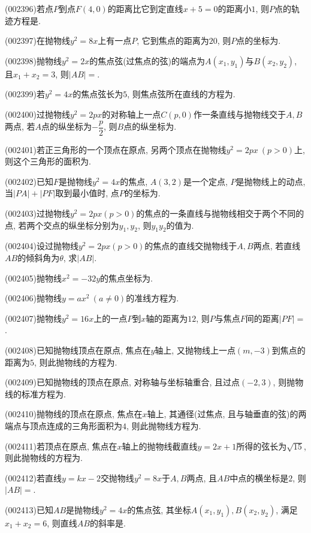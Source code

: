 \item (002396)若点$P$到点$F(4,0)$的距离比它到定直线$x+5=0$的距离小$1$, 则$P$点的轨迹方程是.
\item (002397)在抛物线$y^2=8x$上有一点$P$, 它到焦点的距离为$20$, 则$P$点的坐标为.
\item (002398)抛物线$y^2=2x$的焦点弦(过焦点的弦)的端点为$A(x_1,y_1)$与$B(x_2,y_2)$, 且$x_1+x_2=3$, 则$|AB|=$.
\item (002399)若$y^2=4x$的焦点弦长为$5$, 则焦点弦所在直线的方程为.
\item (002400)过抛物线$y^2=2px$的对称轴上一点$C(p,0)$作一条直线与抛物线交于$A,B$两点,
若$A$点的纵坐标为$-\dfrac{p}{2}$, 则$B$点的纵坐标为.
\item (002401)若正三角形的一个顶点在原点, 另两个顶点在抛物线$y^2=2px \ (p>0)$上, 则这个三角形的面积为.
\item (002402)已知$F$是抛物线$y^2=4x$的焦点, $A(3,2)$是一个定点, $P$是抛物线上的动点, 当$|PA|+|PF|$取到最小值时, 点$P$的坐标为.
\item (002403)过抛物线$y^2=2px(p>0)$的焦点的一条直线与抛物线相交于两个不同的点, 若两个交点的纵坐标分别为$y_1,y_2$,
则$y_1y_2$的值为.
\item (002404)设过抛物线$y^2=2px(p>0)$的焦点的直线交抛物线于$A,B$两点, 若直线$AB$的倾斜角为$\theta$,
求$|AB|$.
\item (002405)抛物线$x^2=-32y$的焦点坐标为.
\item (002406)抛物线$y=ax^2 \ (a\ne 0)$的准线方程为.
\item (002407)抛物线$y^2=16x$上的一点$P$到$x$轴的距离为$12$, 则$P$与焦点$F$间的距离$|PF|=$.
\item (002408)已知抛物线顶点在原点, 焦点在$y$轴上, 又抛物线上一点$(m,-3)$到焦点的距离为$5$, 则此抛物线的方程为.
\item (002409)已知抛物线的顶点在原点, 对称轴与坐标轴重合, 且过点$(-2,3)$, 则抛物线的标准方程为.
\item (002410)抛物线的顶点在原点, 焦点在$x$轴上, 其通径(过焦点, 且与轴垂直的弦)的两端点与顶点连成的三角形面积为$4$, 则此抛物线方程为.
\item (002411)若顶点在原点, 焦点在$x$轴上的抛物线截直线$y=2x+1$所得的弦长为$\sqrt{15}$, 则此抛物线的方程为.
\item (002412)若直线$y=kx-2$交抛物线$y^2=8x$于$A,B$两点, 且$AB$中点的横坐标是$2$, 则$|AB|=$.
\item (002413)已知$AB$是抛物线$y^2=4x$的焦点弦, 其坐标$A(x_1,y_1),B(x_2,y_2)$, 满足$x_1+x_2=6$, 则直线$AB$的斜率是.
